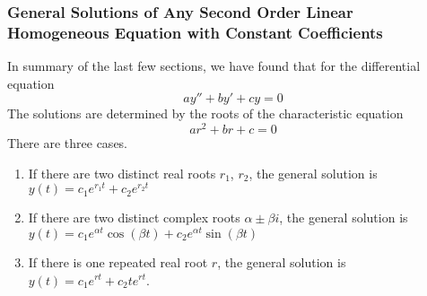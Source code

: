 \subsubsection{General Solutions of Any Second Order Linear Homogeneous Equation with Constant Coefficients}
In summary of the last few sections, we have found that for the differential equation
\[ ay'' + by' + cy = 0\]
The solutions are determined by the roots of the characteristic equation 
\[ ar^2 + br + c = 0 \]
There are three cases.
\begin{enumerate}
    \item If there are two distinct real roots $r_1$, $r_2$, the general solution is $y(t) = c_1e^{r_1t} + c_2e^{r_2 t}$
    \item If there are two distinct complex roots $\alpha \pm \beta i$, the general solution is $y(t) = c_1e^{\alpha t}\cos(\beta t) + c_2e^{\alpha t}\sin(\beta t)$
    \item If there is one repeated real root $r$, the general solution is $y(t) = c_1e^{rt} + c_2te^{rt}$.
\end{enumerate}
